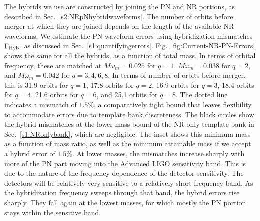 The hybrids we use are constructed by joining the PN and NR portions, as 
described in Sec.~\ref{s2:NRpNhybridwaveforms}. The number of orbits before 
merger at which they are joined depends on the length of the available NR 
waveforms. We estimate the PN waveform errors using hybridization
mismatches $\Gamma_{\mathrm{Hyb}}$, as discussed in Sec.~\ref{s1:quantifyingerrors}. 
Fig.~\ref{fig:Current-NR-PN-Errors} shows the same for all the hybrids, as a 
function of total mass. In terms of orbital frequency, these are
matched at $M\omega_m=0.025$ for $q=1$, $M\omega_m=0.038$ for $q=2$,
and $M\omega_m=0.042$ for $q=3,4,6,8$. In terms of number of orbits
before merger, this is 31.9 orbits for $q=1$, 17.8 orbits for $q=2$,
16.9 orbits for $q=3$, 18.4 orbits for $q=4$, 21.6 orbits for $q=6$,
and 25.1 orbits for $q=8$. The dotted line indicates a mismatch of
$1.5\%$, a comparatively tight bound that leaves flexibility to accommodate
errors due to template bank discreteness. The black circles show the hybrid
mismatches at the lower mass bound of the NR-only template bank in
Sec.~\ref{s1:NRonlybank}, which are negligible. The inset shows this minimum 
mass as a function of mass ratio, as well as the minimum attainable mass if we
accept a hybrid error of $1.5\%$. At lower masses, the mismatches increase
sharply with more of the PN part moving into the Advanced LIGO sensitivity band.
This is due to the nature of the frequency dependence of the detector 
sensitivity. The detectors will be relatively very sensitive to a relatively 
short frequency band. As the hybridization frequency sweeps through that band, 
the hybrid errors rise sharply. They fall again at the lowest masses, for which
mostly the PN portion stays within the sensitive band.


